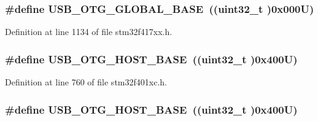 \subsubsection[{\texorpdfstring{U\+S\+B\+\_\+\+O\+T\+G\+\_\+\+G\+L\+O\+B\+A\+L\+\_\+\+B\+A\+SE}{USB_OTG_GLOBAL_BASE}}]{\setlength{\rightskip}{0pt plus 5cm}\#define U\+S\+B\+\_\+\+O\+T\+G\+\_\+\+G\+L\+O\+B\+A\+L\+\_\+\+B\+A\+SE~((uint32\+\_\+t )0x000\+U)}\hypertarget{group___peripheral__registers__structures_ga044aa4388e72d9d47a03f387fb8926fb}{}\label{group___peripheral__registers__structures_ga044aa4388e72d9d47a03f387fb8926fb}


Definition at line 1134 of file stm32f417xx.\+h.

\subsubsection[{\texorpdfstring{U\+S\+B\+\_\+\+O\+T\+G\+\_\+\+H\+O\+S\+T\+\_\+\+B\+A\+SE}{USB_OTG_HOST_BASE}}]{\setlength{\rightskip}{0pt plus 5cm}\#define U\+S\+B\+\_\+\+O\+T\+G\+\_\+\+H\+O\+S\+T\+\_\+\+B\+A\+SE~((uint32\+\_\+t )0x400\+U)}\hypertarget{group___peripheral__registers__structures_ga3bb2dd6c82eefd8587b6146ba36ae071}{}\label{group___peripheral__registers__structures_ga3bb2dd6c82eefd8587b6146ba36ae071}


Definition at line 760 of file stm32f401xc.\+h.

\subsubsection[{\texorpdfstring{U\+S\+B\+\_\+\+O\+T\+G\+\_\+\+H\+O\+S\+T\+\_\+\+B\+A\+SE}{USB_OTG_HOST_BASE}}]{\setlength{\rightskip}{0pt plus 5cm}\#define U\+S\+B\+\_\+\+O\+T\+G\+\_\+\+H\+O\+S\+T\+\_\+\+B\+A\+SE~((uint32\+\_\+t )0x400\+U)}\hypertarget{group___peripheral__registers__structures_ga3bb2dd6c82eefd8587b6146ba36ae071}{}\label{group___peripheral__registers__structures_ga3bb2dd6c82eefd8587b6146ba36ae071}


